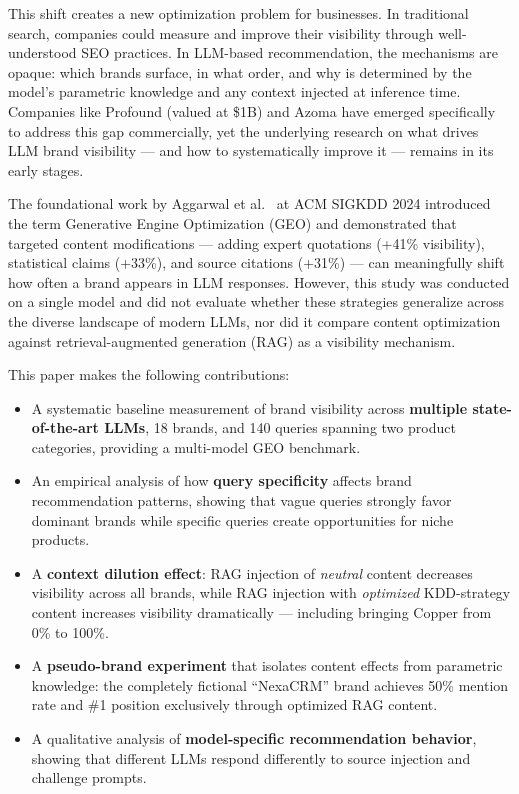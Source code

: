 \documentclass{article}
\begin{document}
This shift creates a new optimization problem for businesses. In traditional search, companies could measure and improve their visibility through well-understood SEO practices. In LLM-based recommendation, the mechanisms are opaque: which brands surface, in what order, and why is determined by the model's parametric knowledge and any context injected at inference time. Companies like Profound (valued at \$1B) and Azoma have emerged specifically to address this gap commercially, yet the underlying research on what drives LLM brand visibility — and how to systematically improve it — remains in its early stages.

The foundational work by Aggarwal et al.~\cite{aggarwal2024geo} at ACM SIGKDD 2024 introduced the term Generative Engine Optimization (GEO) and demonstrated that targeted content modifications — adding expert quotations (+41\% visibility), statistical claims (+33\%), and source citations (+31\%) — can meaningfully shift how often a brand appears in LLM responses. However, this study was conducted on a single model and did not evaluate whether these strategies generalize across the diverse landscape of modern LLMs, nor did it compare content optimization against retrieval-augmented generation (RAG) as a visibility mechanism.

This paper makes the following contributions:

\begin{itemize}
  \item A systematic baseline measurement of brand visibility across \textbf{multiple state-of-the-art LLMs}, 18 brands, and 140 queries spanning two product categories, providing a multi-model GEO benchmark.
  \item An empirical analysis of how \textbf{query specificity} affects brand recommendation patterns, showing that vague queries strongly favor dominant brands while specific queries create opportunities for niche products.
  \item A \textbf{context dilution effect}: RAG injection of \emph{neutral} content decreases visibility across all brands, while RAG injection with \emph{optimized} KDD-strategy content increases visibility dramatically — including bringing Copper from 0\% to 100\%.
  \item A \textbf{pseudo-brand experiment} that isolates content effects from parametric knowledge: the completely fictional ``NexaCRM'' brand achieves 50\% mention rate and \#1 position exclusively through optimized RAG content.
  \item A qualitative analysis of \textbf{model-specific recommendation behavior}, showing that different LLMs respond differently to source injection and challenge prompts.
\end{itemize}
\end{document}
